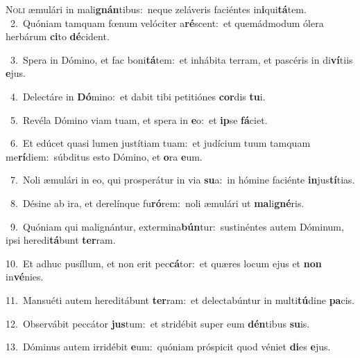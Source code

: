 \lettrine{\initial\textcolor{\initialcolor}{N}}{oli} æmulári in mali\-\textbf{gnán}\-tibus:~\star neque zeláveris faciéntes in\-\textbf{i}\-qui\-\textbf{tá}\-tem.\\
{\numbfont\textcolor{\numbcolor}{~2.}}~Quóniam tamquam fœnum velóciter a\-\textbf{ré}\-scent:~\star et quemádmodum ólera herbárum \textbf{ci}\-to \textbf{dé}\-cident.\par
{\numbfont\textcolor{\numbcolor}{~3.}}~Spera in Dómino, et fac boni\-\textbf{tá}\-tem:~\star et inhábita terram, et pascéris in di\-\textbf{ví}\-tiis \textbf{e}\-jus.\par
{\numbfont\textcolor{\numbcolor}{~4.}}~Delectáre in \textbf{Dó}\-mino:~\star et dabit tibi petitiónes \textbf{cor}\-dis \textbf{tu}\-i.\par
{\numbfont\textcolor{\numbcolor}{~5.}}~Revéla Dómino viam tuam, et spera in \textbf{e}\-o:~\star et \textbf{ip}\-se \textbf{fá}\-ciet.\par
{\numbfont\textcolor{\numbcolor}{~6.}}~Et edúcet quasi lumen justítiam tuam:~\dagger et judícium tuum tamquam me\-\textbf{rí}\-diem:~\star súbditus esto Dómino, et \textbf{o}\-ra \textbf{e}\-um.\par
{\numbfont\textcolor{\numbcolor}{~7.}}~Noli æmulári in eo, qui prosperátur in via \textbf{su}\-a:~\star in hómine faciénte \textbf{in}\-jus\-\textbf{tí}\-tias.\par
{\numbfont\textcolor{\numbcolor}{~8.}}~Désine ab ira, et derelínque fu\-\textbf{ró}\-rem:~\star noli æmulári ut \textbf{ma}\-li\-\textbf{gné}\-ris.\par
{\numbfont\textcolor{\numbcolor}{~9.}}~Quóniam qui malignántur, extermina\-\textbf{bún}\-tur:~\star sustinéntes autem Dóminum, ipsi heredi\-\textbf{tá}\-bunt \textbf{ter}\-ram.\par
{\numbfont\textcolor{\numbcolor}{10.}}~Et adhuc pusíllum, et non erit pec\-\textbf{cá}\-tor:~\star et quæres locum ejus et \textbf{non} in\-\textbf{vé}\-nies.\par
{\numbfont\textcolor{\numbcolor}{11.}}~Mansuéti autem hereditábunt \textbf{ter}\-ram:~\star et delectabúntur in multi\-\textbf{tú}\-dine \textbf{pa}\-cis.\par
{\numbfont\textcolor{\numbcolor}{12.}}~Observábit peccátor \textbf{jus}\-tum:~\star et stridébit super eum \textbf{dén}\-tibus \textbf{su}\-is.\par
{\numbfont\textcolor{\numbcolor}{13.}}~Dóminus autem irridébit \textbf{e}\-um:~\star quóniam próspicit quod véniet \textbf{di}\-es \textbf{e}\-jus.\par
